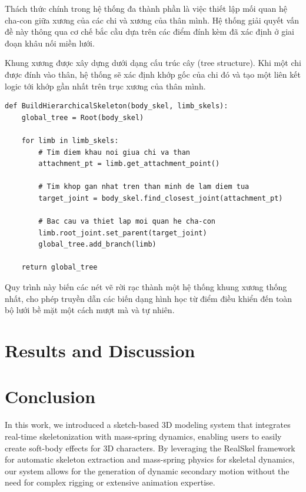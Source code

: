 \documentclass{report}
\newenvironment{graycode}
{\begin{mdframed}[backgroundcolor=light-gray, linecolor=light-gray, roundcorner=5pt]}
{\end{mdframed}}
\begin{document}
Thách thức chính trong hệ thống đa thành phần là việc thiết lập mối quan hệ cha-con giữa xương của các chi và xương của thân mình. Hệ thống giải quyết vấn đề này thông qua cơ chế bắc cầu dựa trên các điểm đính kèm đã xác định ở giai đoạn khâu nối miền lưới.

Khung xương được xây dựng dưới dạng cấu trúc cây (tree structure). Khi một chi được đính vào thân, hệ thống sẽ xác định khớp gốc của chi đó và tạo một liên kết logic tới khớp gần nhất trên trục xương của thân mình.

\begin{graycode}
\begin{lstlisting}[caption=Mã giả thiết lập liên kết phân cấp]
def BuildHierarchicalSkeleton(body_skel, limb_skels):
    global_tree = Root(body_skel)
    
    for limb in limb_skels:
        # Tim diem khau noi giua chi va than
        attachment_pt = limb.get_attachment_point()
        
        # Tim khop gan nhat tren than minh de lam diem tua
        target_joint = body_skel.find_closest_joint(attachment_pt)
        
        # Bac cau va thiet lap moi quan he cha-con
        limb.root_joint.set_parent(target_joint)
        global_tree.add_branch(limb)
        
    return global_tree
\end{lstlisting}
\end{graycode}

Quy trình này biến các nét vẽ rời rạc thành một hệ thống khung xương thống nhất, cho phép truyền dẫn các biến dạng hình học từ điểm điều khiển đến toàn bộ lưới bề mặt một cách mượt mà và tự nhiên.


\chapter{Results and Discussion}


\chapter{Conclusion}
In this work, we introduced a sketch-based 3D modeling system that integrates real-time skeletonization with mass-spring dynamics, enabling users to easily create soft-body effects for 3D characters. By leveraging the RealSkel \citep{ma2021realtimeskeletonizationsketchbasedmodeling} framework for automatic skeleton extraction and mass-spring physics \citep{fastmassspring} for skeletal dynamics, our system allows for the generation of dynamic secondary motion without the need for complex rigging or extensive animation expertise.
\end{document}
